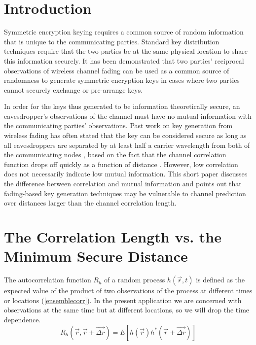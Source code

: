\documentclass[conference]{ieeetran}
\begin{document}
\section{Introduction}
Symmetric encryption keying requires a common source of random information that is unique to the communicating parties. Standard key distribution techniques require that the two parties be at the same physical location to share this information securely.  
It has been demonstrated \cite{azimisadjadi2007, bloch2008, mathur2008, ye2010} that two parties' reciprocal observations of wireless channel fading can be used as a common source of randomness to generate symmetric encryption keys in cases where two parties cannot securely exchange or pre-arrange keys.  

In order for the keys thus generated to be information theoretically secure, an eavesdropper's observations of the channel must have no mutual information with the communicating parties' observations.  Past work on key generation from wireless fading has often stated that the key can be considered secure as long as all eavesdroppers are separated by at least half a carrier wavelength from both of the communicating nodes \cite{azimisadjadi2007, bloch2008, mathur2008, ye2010}, based on the fact that the channel correlation function drops off quickly as a function of distance \cite{jakes1974}.  However, low correlation does not necessarily indicate low mutual information.  This short paper discusses the difference between correlation and mutual information and points out that fading-based key generation techniques may be vulnerable to channel prediction \cite{duel-hallen2000, svantesson2003} over distances larger than the channel correlation length.

\section{The Correlation Length vs. the Minimum Secure Distance}\label{corrlen}
The autocorrelation function $R_h$ of a random process $h(\vec{r},t)$ is defined as the expected value of the product of two observations of the process at different times or locations (\ref{ensemblecorr}).  In the present application we are concerned with observations at the same time but at different locations, so we will drop the time dependence.
\begin{equation}\label{ensemblecorr}
R_h(\vec{r},\vec{r}+\vec{\Delta r}) = E[h(\vec{r})h^*(\vec{r}+\vec{\Delta r})]
\end{equation}
\end{document}
